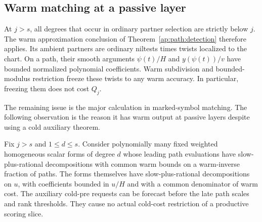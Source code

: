 \subsection{Warm matching at a passive layer}

At $j>s$, all degrees that occur in ordinary partner selection are
strictly below $j$.  The warm approximation conclusion of
Theorem~\ref{ap:path:detection} therefore applies.  Its ambient
partners are ordinary niltests times twists localized to the chart.
On a path, their smooth arguments $\psi(t)/H$ and $y(\psi(t))/v$
have bounded normalized polynomial coefficients.  Warm subdivision
and bounded-modulus restriction freeze these twists to any warm
accuracy.  In particular, freezing them does not cost $Q_j$.

The remaining issue is the major calculation in marked-symbol
matching.  The following observation is the reason it has warm
output at passive layers despite using a cold auxiliary theorem.

\begin{lemma}\label{ap:passive:warm-matching}
Fix $j>s$ and $1\leq d\leq s$.  Consider polynomially many fixed
weighted homogeneous scalar forms of degree $d$ whose leading path
evaluations have slow-plus-rational decompositions with common warm
bounds on a warm-inverse fraction of paths.  The forms themselves
have slow-plus-rational decompositions on $u$, with coefficients
bounded in $u/H$ and with a common denominator of warm cost.
The auxiliary cold-pre requests can be forecast before the late
path scales and rank thresholds.  They cause no actual cold-cost
restriction of a productive scoring slice.
\end{lemma}

